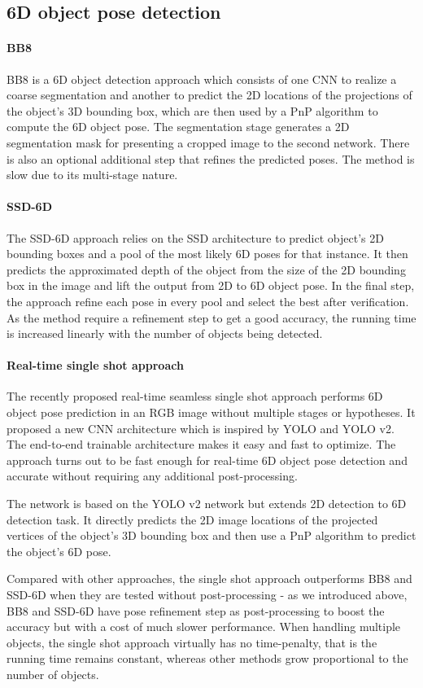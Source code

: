 \subsection{6D object pose detection}

\paragraph{BB8}
BB8 \cite{rad2017bb8} is a 6D object detection approach which consists of one CNN to realize a coarse segmentation and another to predict the 2D locations of the projections of the object’s 3D bounding box, which are then used by a PnP algorithm to compute the 6D object pose. The segmentation stage generates a 2D segmentation mask for presenting a cropped image to the second network. There is also an optional additional step that refines the predicted poses. The method is slow due to its multi-stage nature.

\paragraph{SSD-6D}
The SSD-6D \cite{kehl2017ssd} approach relies on the SSD architecture to predict object's 2D bounding boxes and a pool of the most likely 6D poses for that instance. It then predicts the approximated depth of the object from the size of the 2D bounding box in the image and lift the output from 2D to 6D object pose. In the final step, the approach refine each pose in every
pool and select the best after verification. As the method require a refinement step to get a good accuracy, the running time is increased linearly with the number of objects being detected.

\paragraph{Real-time single shot approach}

The recently proposed real-time seamless single shot approach \cite{tekin2018real} performs 6D object pose prediction in an RGB image without multiple stages or hypotheses. It proposed a new CNN architecture which is inspired by YOLO and YOLO v2. The end-to-end trainable architecture makes it easy and fast to optimize. The approach turns out to be fast enough for real-time 6D object pose detection and accurate without requiring any additional post-processing.

The network is based on the YOLO v2 network but extends 2D detection to 6D detection task. It directly predicts the 2D image locations of the projected vertices of the object’s 3D bounding box and then use a PnP algorithm to predict the object’s 6D pose.

Compared with other approaches, the single shot approach outperforms BB8 \cite{rad2017bb8} and SSD-6D \cite{kehl2017ssd} when they are tested without post-processing - as we introduced above, BB8 and SSD-6D have pose refinement step as post-processing to boost the accuracy but with a cost of much slower performance. When handling multiple objects, the single shot approach virtually has no time-penalty, that is the running time remains constant, whereas other methods grow proportional to the number of objects.
